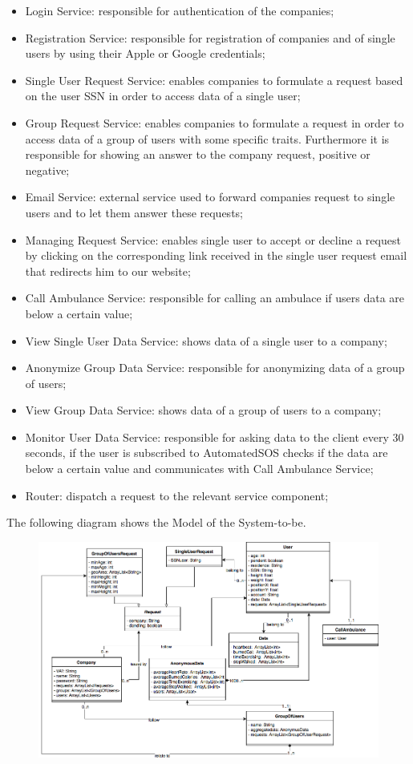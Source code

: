 \documentclass{article}
\begin{document}
\begin{itemize}
\item Login Service: responsible for authentication of the companies;
\item Registration Service: responsible for registration of companies and of single users by using their Apple or Google credentials;
\item Single User Request Service: enables companies to formulate a request based on the user SSN in order to access data of a single user;
\item Group Request Service: enables companies to formulate a request in order to access data of a group of users with some specific traits. Furthermore it is responsible for showing an answer to the company request, positive or negative;
\item Email Service: external service used to forward companies request to single users and to let them answer these requests;
\item Managing Request Service: enables single user to accept or decline a request by clicking on the corresponding link received in the single user request email that redirects him to our website;
\item Call Ambulance Service: responsible for calling an ambulace if users data are below a certain value;
\item View Single User Data Service: shows data of a single user to a company;
\item Anonymize Group Data Service: responsible for anonymizing data of a group of users;
\item View Group Data Service: shows data of a group of users to a company;
\item Monitor User Data Service: responsible for asking data to the client every 30 seconds, if the user is subscribed to AutomatedSOS checks if the data are below a certain value and communicates with Call Ambulance Service;
\item Router: dispatch a request to the relevant service component;
\end{itemize}
The following diagram shows the Model of the System-to-be. 
\begin{figure}[h!]
\centering
    \textbf{}\par\medskip
	\includegraphics[width= \linewidth]{model.png}
\end{figure}
\end{document}
